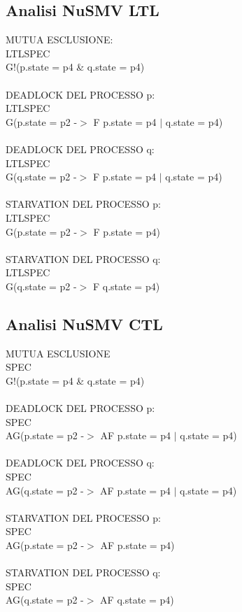\documentclass{article}
\begin{document}
\subsection{Analisi NuSMV LTL}
MUTUA ESCLUSIONE:
\\LTLSPEC
\\G!(p.state = p4 \& q.state = p4)
\\\\DEADLOCK DEL PROCESSO p:
\\LTLSPEC
\\G(p.state = p2 -$>$ F p.state = p4 $|$ q.state = p4)
\\\\DEADLOCK DEL PROCESSO q:
\\LTLSPEC
\\G(q.state = p2 -$>$ F p.state = p4 $|$ q.state = p4)
\\\\STARVATION DEL PROCESSO p:
\\LTLSPEC
\\G(p.state = p2 -$>$ F p.state = p4)
\\\\STARVATION DEL PROCESSO q:
\\LTLSPEC
\\G(q.state = p2 -$>$ F q.state = p4)
\subsection{Analisi NuSMV CTL}
MUTUA ESCLUSIONE
\\SPEC
\\G!(p.state = p4 \& q.state = p4)
\\\\DEADLOCK DEL PROCESSO p:
\\SPEC
\\AG(p.state = p2 -$>$ AF p.state = p4 $|$ q.state = p4)
\\\\DEADLOCK DEL PROCESSO q:
\\SPEC
\\AG(q.state = p2 -$>$ AF p.state = p4 $|$ q.state = p4)
\\\\STARVATION DEL PROCESSO p:
\\SPEC
\\AG(p.state = p2 -$>$ AF p.state = p4)
\\\\STARVATION DEL PROCESSO q:
\\SPEC
\\AG(q.state = p2 -$>$ AF q.state = p4)
\end{document}
